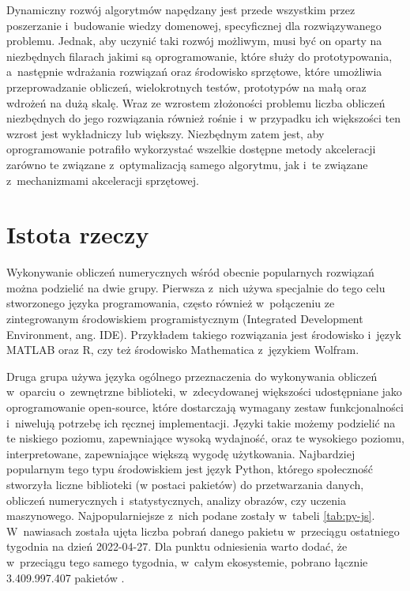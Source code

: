 Dynamiczny rozwój algorytmów napędzany jest przede wszystkim przez poszerzanie i~budowanie wiedzy domenowej, specyficznej dla rozwiązywanego problemu. Jednak, aby uczynić taki rozwój możliwym, musi być on oparty na niezbędnych filarach jakimi są oprogramowanie, które służy do prototypowania, a~następnie wdrażania rozwiązań oraz środowisko sprzętowe, które umożliwia przeprowadzanie obliczeń, wielokrotnych testów, prototypów na małą oraz wdrożeń na dużą skalę. Wraz ze wzrostem złożoności problemu liczba obliczeń niezbędnych do jego rozwiązania również rośnie i~w przypadku ich większości ten wzrost jest wykładniczy lub większy. Niezbędnym zatem jest, aby oprogramowanie potrafiło wykorzystać wszelkie dostępne metody akceleracji zarówno te związane z~optymalizacją samego algorytmu, jak i~te związane z~mechanizmami akceleracji sprzętowej.

\section{Istota rzeczy}

Wykonywanie obliczeń numerycznych wśród obecnie popularnych rozwiązań można podzielić na dwie grupy. Pierwsza z~nich używa specjalnie do tego celu stworzonego języka programowania, często również w~połączeniu ze zintegrowanym środowiskiem programistycznym (Integrated Development Environment, ang. IDE). Przykładem takiego rozwiązania jest środowisko i~język MATLAB\cite{matlab} oraz R\cite{r}, czy też środowisko Mathematica z~językiem Wolfram\cite{mathematica}.

Druga grupa używa języka ogólnego przeznaczenia do wykonywania obliczeń w~oparciu o~zewnętrzne biblioteki, w~zdecydowanej większości udostępniane jako oprogramowanie open-source, które dostarczają wymagany zestaw funkcjonalności i~niwelują potrzebę ich ręcznej implementacji. Języki takie możemy podzielić na te niskiego poziomu, zapewniające wysoką wydajność, oraz te wysokiego poziomu, interpretowane, zapewniające większą wygodę użytkowania. Najbardziej popularnym tego typu środowiskiem jest język Python, którego społeczność stworzyła liczne biblioteki (w postaci pakietów) do przetwarzania danych, obliczeń numerycznych i~statystycznych, analizy obrazów, czy uczenia maszynowego. Najpopularniejsze z~nich podane zostały w~tabeli \ref{tab:py-js}. W~nawiasach została ujęta liczba pobrań danego pakietu w~przeciągu ostatniego tygodnia na dzień 2022-04-27. Dla punktu odniesienia warto dodać, że w~przeciągu tego samego tygodnia, w~całym ekosystemie, pobrano łącznie 3.409.997.407 pakietów \cite{pypi-stats}.

